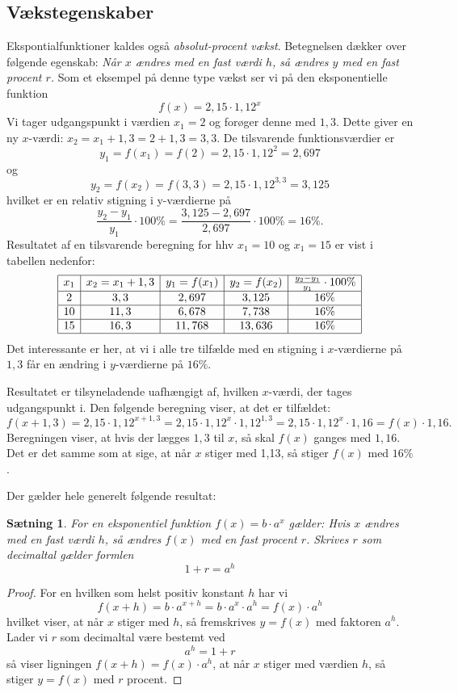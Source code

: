 \documentclass[12pt,oneside,a4paper]{article}
\newtheorem{thm}{Sætning}[section]
\begin{document}
\subsection{Vækstegenskaber}
Ekspontialfunktioner kaldes også {\em absolut-procent vækst}. Betegnelsen
dækker over følgende egenskab: {\em Når $x$ ændres med en fast værdi $h$, så
ændres $y$ med en fast procent $r$.} Som et eksempel på denne type vækst ser vi
på den eksponentielle funktion
$$
f(x) = 2,15 \cdot 1,12^x
$$
Vi tager udgangspunkt i værdien $x_1=2$ og forøger denne med $1,3$. Dette giver
en ny $x$-værdi: $x_2 = x_1 + 1,3 = 2 + 1,3 = 3,3$. De tilsvarende 
funktionsværdier er 
$$
y_1 = f(x_1) = f(2) = 2,15 \cdot 1,12^2 = 2,697
$$
og
$$
y_2 = f(x_2) = f(3,3) = 2,15 \cdot 1,12^{3,3} = 3,125
$$
hvilket er en relativ stigning i y-værdierne på 
$$
\frac{y_2-y_1}{y_1} \cdot 100\% = \frac{3,125 - 2,697}{2,697} \cdot 100 \% = 16 \%.
$$
Resultatet af en tilsvarende beregning for hhv $x_1 = 10$ og $x_1 = 15$ er vist
i tabellen nedenfor:
$$
\begin{array}{|c|c|c|c|c|}
    \hline 
    x_1 & x_2 = x_1 + 1,3 & y_1 = f(x_1) & y_2 = f(x_2) & \frac{y_2-y_1}{y_1} \cdot 100 \% \\
    \hline 
    2 & 3,3 & 2,697 & 3,125 & 16\% \\
    \hline 
    10 & 11,3 & 6,678 & 7,738 & 16\% \\
    \hline 
    15 & 16,3 & 11,768 & 13,636 & 16\% \\
    \hline
\end{array}
$$
Det interessante er her, at vi i alle tre tilfælde med en stigning i
$x$-værdierne på $1,3$ får en ændring i $y$-værdierne på $16\%$.

Resultatet er tilsyneladende uafhængigt af, hvilken $x$-værdi, der tages
udgangspunkt i. Den følgende beregning viser, at det er tilfældet:
$$
f(x + 1,3) = 2,15 \cdot 1,12^{x+1,3} = 2,15 \cdot 1,12^x \cdot 1,12^{1,3} = 2,15 \cdot 1,12^x \cdot 1,16 = f(x) \cdot 1,16.
$$
Beregningen viser, at hvis der lægges $1,3$ til $x$, så skal $f(x)$ ganges med
$1,16$. Det er det samme som at sige, at når $x$ stiger med 1,13, så stiger
$f(x)$ med $16\%$.

Der gælder hele generelt følgende resultat:

\begin{thm}
    For en eksponentiel funktion $f(x) = b\cdot a^x$ gælder:
    Hvis $x$ ændres med en fast værdi $h$, så ændres $f(x)$ med en fast procent
    $r$. Skrives $r$ som decimaltal gælder formlen
    $$
    1+r = a^h
    $$
\end{thm}
\begin{proof}
    For en hvilken som helst positiv konstant $h$ har vi
    $$
    f(x+h) = b\cdot a^{x+h} = b\cdot a^x\cdot  a^h = f(x)\cdot  a^h
    $$
    hvilket viser, at når $x$ stiger med $h$, så fremskrives $y=f(x)$ med
    faktoren $a^h$. Lader vi $r$ som decimaltal være bestemt ved
    $$
    a^h = 1+r
    $$
    så viser ligningen $f(x+h) = f(x) \cdot a^h$, at når $x$ stiger med værdien $h$,
    så stiger $y=f(x)$ med $r$ procent.
\end{proof}
\end{document}
